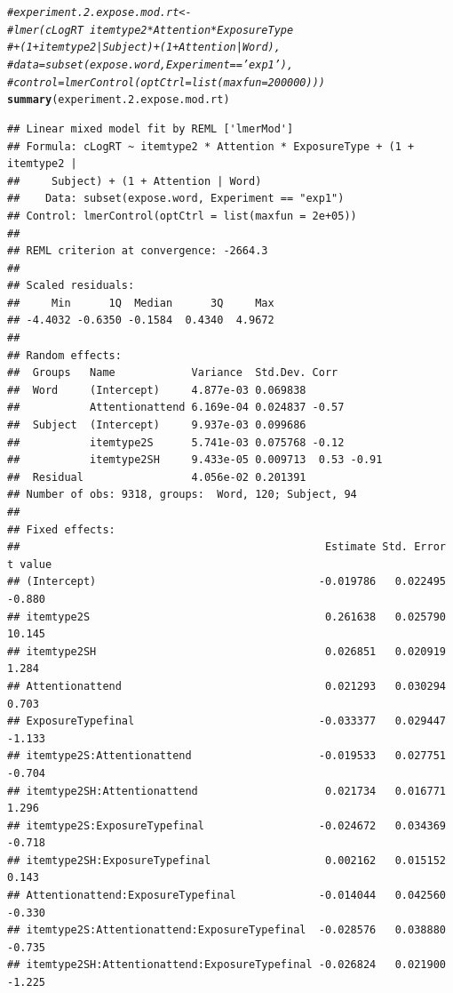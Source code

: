 \documentclass[11pt]{article}\usepackage[]{graphicx}\usepackage[]{color}
\makeatletter
\newcommand{\hlcom}[1]{\textcolor[rgb]{0.678,0.584,0.686}{\textit{#1}}}%
\newcommand{\hlstd}[1]{\textcolor[rgb]{0.345,0.345,0.345}{#1}}%
\newcommand{\hlkwd}[1]{\textcolor[rgb]{0.737,0.353,0.396}{\textbf{#1}}}%
\newenvironment{kframe}{%
 \def\at@end@of@kframe{}%
 \ifinner\ifhmode%
  \def\at@end@of@kframe{\end{minipage}}%
  \begin{minipage}{\columnwidth}%
 \fi\fi%
 \def\FrameCommand##1{\hskip\@totalleftmargin \hskip-\fboxsep
 \colorbox{shadecolor}{##1}\hskip-\fboxsep
     \hskip-\linewidth \hskip-\@totalleftmargin \hskip\columnwidth}%
 \MakeFramed {\advance\hsize-\width
   \@totalleftmargin\z@ \linewidth\hsize
   \@setminipage}}%
 {\par\unskip\endMakeFramed%
 \at@end@of@kframe}
\newenvironment{knitrout}{}{} %
\makeatother
\begin{document}
\begin{knitrout}\footnotesize
{}\color{fgcolor}\begin{kframe}
\begin{alltt}
 \hlcom{#experiment.2.expose.mod.rt <- }
 \hlcom{#lmer(cLogRT ~ itemtype2*Attention*ExposureType }
 \hlcom{#+ (1+itemtype2|Subject) + (1+Attention|Word),}
 \hlcom{#data = subset(expose.word, Experiment == 'exp1'), }
 \hlcom{#control = lmerControl(optCtrl = list(maxfun = 200000) ))}
 \hlkwd{summary}\hlstd{(experiment.2.expose.mod.rt)}
\end{alltt}
\begin{verbatim}
## Linear mixed model fit by REML ['lmerMod']
## Formula: cLogRT ~ itemtype2 * Attention * ExposureType + (1 + itemtype2 |  
##     Subject) + (1 + Attention | Word)
##    Data: subset(expose.word, Experiment == "exp1")
## Control: lmerControl(optCtrl = list(maxfun = 2e+05))
## 
## REML criterion at convergence: -2664.3
## 
## Scaled residuals: 
##     Min      1Q  Median      3Q     Max 
## -4.4032 -0.6350 -0.1584  0.4340  4.9672 
## 
## Random effects:
##  Groups   Name            Variance  Std.Dev. Corr       
##  Word     (Intercept)     4.877e-03 0.069838            
##           Attentionattend 6.169e-04 0.024837 -0.57      
##  Subject  (Intercept)     9.937e-03 0.099686            
##           itemtype2S      5.741e-03 0.075768 -0.12      
##           itemtype2SH     9.433e-05 0.009713  0.53 -0.91
##  Residual                 4.056e-02 0.201391            
## Number of obs: 9318, groups:  Word, 120; Subject, 94
## 
## Fixed effects:
##                                                Estimate Std. Error t value
## (Intercept)                                   -0.019786   0.022495  -0.880
## itemtype2S                                     0.261638   0.025790  10.145
## itemtype2SH                                    0.026851   0.020919   1.284
## Attentionattend                                0.021293   0.030294   0.703
## ExposureTypefinal                             -0.033377   0.029447  -1.133
## itemtype2S:Attentionattend                    -0.019533   0.027751  -0.704
## itemtype2SH:Attentionattend                    0.021734   0.016771   1.296
## itemtype2S:ExposureTypefinal                  -0.024672   0.034369  -0.718
## itemtype2SH:ExposureTypefinal                  0.002162   0.015152   0.143
## Attentionattend:ExposureTypefinal             -0.014044   0.042560  -0.330
## itemtype2S:Attentionattend:ExposureTypefinal  -0.028576   0.038880  -0.735
## itemtype2SH:Attentionattend:ExposureTypefinal -0.026824   0.021900  -1.225

\end{verbatim}
\end{kframe}
\end{knitrout}
\end{document}
